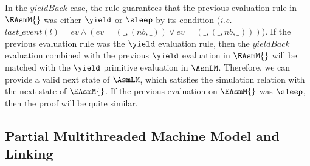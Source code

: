 In the $yieldBack$ case, the rule guarantees that the previous evaluation rule in $\EAsmM{}$ was either $\yield$ or $\sleep$ 
by its condition (\textit{i.e.} $last\_event(l) = ev \wedge (ev = (\_, (nb, \_)) \vee ev = (\_, (\_, nb, \_)))$).
If the previous evaluation rule was the $\yield$ evaluation rule,
then the $yieldBack$ evaluation combined with the previous $\yield$ evaluation in $\EAsmM{}$
will be matched with the $\yield$ primitive evaluation in $\AsmLM$. 
Therefore, we can provide a valid next state of $\AsmLM$, which satisfies the simulation relation with the next state of 
$\EAsmM{}$. If the previous evaluation on $\EAsmM{}$ was $\sleep$, then the proof will be quite similar.

\subsection{Partial Multithreaded Machine Model and Linking}\label{subsec:singleeasm}

